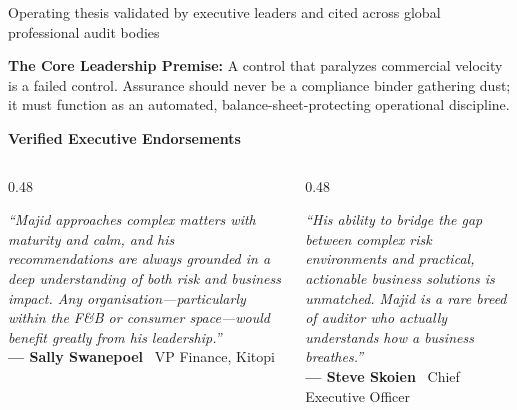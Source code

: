 \documentclass[aspectratio=169, 8pt]{beamer}
\begin{document}
\begin{frame}{Operating thesis validated by executive leaders and cited across global professional audit bodies}
    \vspace{-0.15cm}
    \begin{tcolorbox}[colback=cardBg, colframe=cardBorder, arc=1pt, boxrule=0.5pt, left=6pt, right=6pt, top=3pt, bottom=3pt]
        \textbf{\color{obsidian} The Core Leadership Premise:} A control that paralyzes commercial velocity is a failed control. Assurance should never be a compliance binder gathering dust; it must function as an automated, balance-sheet-protecting operational discipline.
    \end{tcolorbox}
    
    \vspace{0.15cm}
    \textbf{\small \color{terracotta} Verified Executive Endorsements}
    \vspace{0.1cm}
    
    \begin{columns}[T]
        \begin{column}{0.48\textwidth}
            \begin{tcolorbox}[colback=white, colframe=cardBorder, arc=1pt, boxrule=0.5pt, left=4pt, right=4pt, top=3pt, bottom=3pt]
                \textit{\scriptsize ``Majid approaches complex matters with maturity and calm, and his recommendations are always grounded in a deep understanding of both risk and business impact. Any organisation—particularly within the F\&B or consumer space—would benefit greatly from his leadership.''} \\
                \vspace{0.1cm}
                \textbf{\scriptsize \color{obsidian} — Sally Swanepoel} \textbar\ \textcolor{terracotta}{\scriptsize VP Finance, Kitopi}
            \end{tcolorbox}
        \end{column}
        \begin{column}{0.48\textwidth}
            \begin{tcolorbox}[colback=white, colframe=cardBorder, arc=1pt, boxrule=0.5pt, left=4pt, right=4pt, top=3pt, bottom=3pt]
                \textit{\scriptsize ``His ability to bridge the gap between complex risk environments and practical, actionable business solutions is unmatched. Majid is a rare breed of auditor who actually understands how a business breathes.''} \\
                \vspace{0.1cm}
                \textbf{\scriptsize \color{obsidian} — Steve Skoien} \textbar\ \textcolor{terracotta}{\scriptsize Chief Executive Officer}
            \end{tcolorbox}
        \end{column}
    \end{columns}
    

\end{frame}
\end{document}
